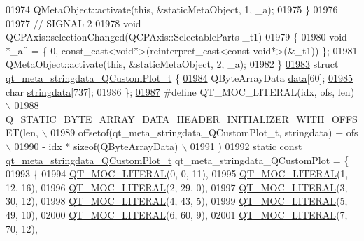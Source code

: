 \begin{DoxyCode}
01974     QMetaObject::activate(\textcolor{keyword}{this}, &staticMetaObject, 1, \_a);
01975 \}
01976 
01977 \textcolor{comment}{// SIGNAL 2}
01978 \textcolor{keywordtype}{void} QCPAxis::selectionChanged(QCPAxis::SelectableParts \_t1)
01979 \{
01980     \textcolor{keywordtype}{void} *\_a[] = \{ 0, \textcolor{keyword}{const\_cast<}\textcolor{keywordtype}{void}*\textcolor{keyword}{>}(\textcolor{keyword}{reinterpret\_cast<}\textcolor{keyword}{const }\textcolor{keywordtype}{void}*\textcolor{keyword}{>}(&\_t1)) \};
01981     QMetaObject::activate(\textcolor{keyword}{this}, &staticMetaObject, 2, \_a);
01982 \}
\hypertarget{a00016_source_l01983}{}\hyperlink{a00016}{01983} \textcolor{keyword}{struct }\hyperlink{a00016_d8/d87/a00118}{qt\_meta\_stringdata\_QCustomPlot\_t} \{
\hypertarget{a00016_source_l01984}{}\hyperlink{a00016_a294e0b700c66ea0a3f528f255fa52fff}{01984}     QByteArrayData \hyperlink{a00016_a294e0b700c66ea0a3f528f255fa52fff}{data}[60];
\hypertarget{a00016_source_l01985}{}\hyperlink{a00016_a06c7bf819765fdc7a40739cfb2bb681c}{01985}     \textcolor{keywordtype}{char} \hyperlink{a00016_a06c7bf819765fdc7a40739cfb2bb681c}{stringdata}[737];
01986 \};
\hypertarget{a00016_source_l01987}{}\hyperlink{a00016_a75bb9482d242cde0a06c9dbdc6b83abe}{01987} \textcolor{preprocessor}{#define QT\_MOC\_LITERAL(idx, ofs, len) \(\backslash\)}
01988 \textcolor{preprocessor}{    Q\_STATIC\_BYTE\_ARRAY\_DATA\_HEADER\_INITIALIZER\_WITH\_OFFSET(len, \(\backslash\)}
01989 \textcolor{preprocessor}{    offsetof(qt\_meta\_stringdata\_QCustomPlot\_t, stringdata) + ofs \(\backslash\)}
01990 \textcolor{preprocessor}{        - idx * sizeof(QByteArrayData) \(\backslash\)}
01991 \textcolor{preprocessor}{    )}
01992 \textcolor{keyword}{static} \textcolor{keyword}{const} \hyperlink{a00016_d8/d87/a00118}{qt\_meta\_stringdata\_QCustomPlot\_t} 
      qt\_meta\_stringdata\_QCustomPlot = \{
01993     \{
01994 \hyperlink{a00016_a75bb9482d242cde0a06c9dbdc6b83abe}{QT\_MOC\_LITERAL}(0, 0, 11),
01995 \hyperlink{a00016_a75bb9482d242cde0a06c9dbdc6b83abe}{QT\_MOC\_LITERAL}(1, 12, 16),
01996 \hyperlink{a00016_a75bb9482d242cde0a06c9dbdc6b83abe}{QT\_MOC\_LITERAL}(2, 29, 0),
01997 \hyperlink{a00016_a75bb9482d242cde0a06c9dbdc6b83abe}{QT\_MOC\_LITERAL}(3, 30, 12),
01998 \hyperlink{a00016_a75bb9482d242cde0a06c9dbdc6b83abe}{QT\_MOC\_LITERAL}(4, 43, 5),
01999 \hyperlink{a00016_a75bb9482d242cde0a06c9dbdc6b83abe}{QT\_MOC\_LITERAL}(5, 49, 10),
02000 \hyperlink{a00016_a75bb9482d242cde0a06c9dbdc6b83abe}{QT\_MOC\_LITERAL}(6, 60, 9),
02001 \hyperlink{a00016_a75bb9482d242cde0a06c9dbdc6b83abe}{QT\_MOC\_LITERAL}(7, 70, 12),

\end{DoxyCode}
